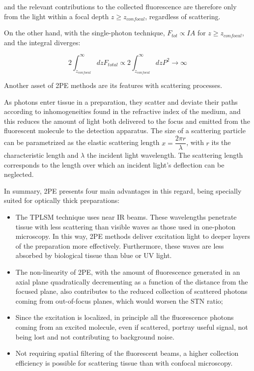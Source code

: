 and the relevant contributions to the collected fluorescence are therefore only from the light within a focal depth $z \geqslant z_{confocal}$, regardless of scattering.

On the other hand, with the single-photon technique, $F_{tot} \propto I A$ for $z \geqslant z_{confocal}$, and the integral diverges:

\begin{equation}
2 \int_{z_{confocal}}^{\infty} dz F_{total} \propto  2 \int_{z_{confocal}}^{\infty} dz P^2 \to \infty
\end{equation}


Another asset of 2PE methods are its features with scattering processes.

As photons enter tissue in a preparation, they scatter and deviate their paths according to inhomogeneities found in the refractive index of the medium, and this reduces the amount of light both delivered to the focus and emitted from the fluorescent molecule to the detection apparatus. The size of a scattering particle can be parametrized as the elastic scattering length $x = \dfrac{2 \pi r}{\lambda}$, with $r$ its the characteristic length and $\lambda$ the incident light wavelength. The scattering length corresponds to the length over which an incident light's deflection can be neglected.

In summary, 2PE presents four main advantages in this regard, being specially suited for optically thick preparations:

\begin{itemize}
\item The TPLSM technique uses near IR beams. These wavelengths penetrate tissue with less scattering than visible waves as those used in one-photon microscopy. In this way, 2PE methods deliver excitation light to deeper layers of the preparation more effectively. Furthermore, these waves are less absorbed by biological tissue than blue or UV light.
\item The non-linearity of 2PE, with the amount of fluorescence generated in an axial plane quadratically decrementing as a function of the distance from the focused plane, also contributes to the reduced collection of scattered photons coming from out-of-focus planes, which would worsen the STN ratio;
\item Since the excitation is localized, in principle all the fluorescence photons coming from an excited molecule, even if scattered, portray useful signal, not being lost and not contributing to background noise.
\item Not requiring spatial filtering of the fluorescent beams, a higher collection efficiency is possible for scattering tissue than with confocal microscopy.
\end{itemize}

